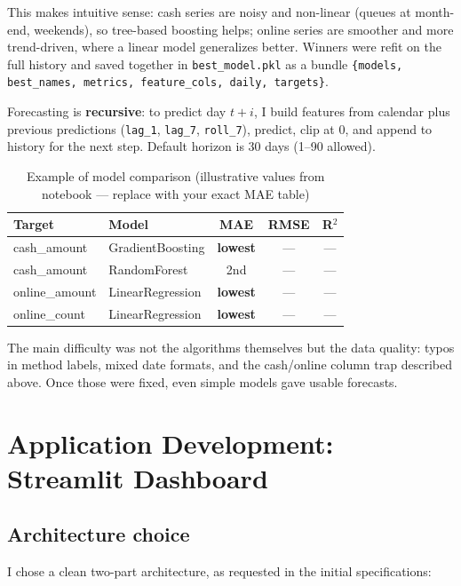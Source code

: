 \documentclass[12pt,a4paper]{report}
\begin{document}
This makes intuitive sense: cash series are noisy and non-linear (queues at month-end, weekends), so tree-based boosting helps; online series are smoother and more trend-driven, where a linear model generalizes better. Winners were refit on the full history and saved together in \texttt{best\_model.pkl} as a bundle \texttt{\{models, best\_names, metrics, feature\_cols, daily, targets\}}.

Forecasting is \textbf{recursive}: to predict day $t+i$, I build features from calendar plus previous predictions (\texttt{lag\_1}, \texttt{lag\_7}, \texttt{roll\_7}), predict, clip at 0, and append to history for the next step. Default horizon is 30 days (1--90 allowed).

\begin{table}[H]
\centering
\caption{Example of model comparison (illustrative values from notebook --- replace with your exact MAE table)}
\begin{tabular}{@{}llccc@{}}
\toprule
Target & Model & MAE & RMSE & R$^2$ \\
\midrule
cash\_amount & GradientBoosting & \textbf{lowest} & --- & --- \\
cash\_amount & RandomForest & 2nd & --- & --- \\
online\_amount & LinearRegression & \textbf{lowest} & --- & --- \\
online\_count & LinearRegression & \textbf{lowest} & --- & --- \\
\bottomrule
\end{tabular}
\end{table}

The main difficulty was not the algorithms themselves but the data quality: typos in method labels, mixed date formats, and the cash/online column trap described above. Once those were fixed, even simple models gave usable forecasts.

\chapter{Application Development: Streamlit Dashboard}

\section{Architecture choice}

I chose a clean two-part architecture, as requested in the initial specifications:
\end{document}
